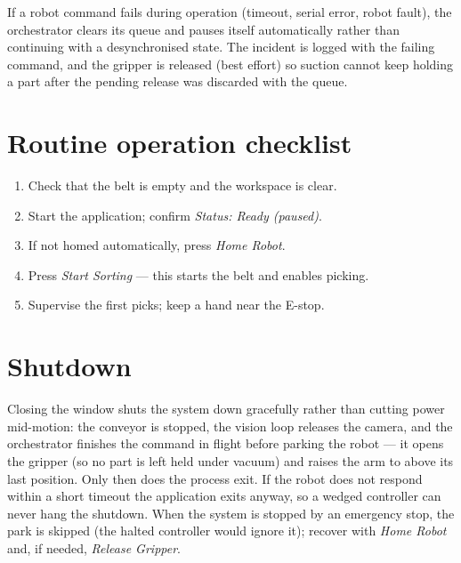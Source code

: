 \begin{notebox}
  If a robot command fails during operation (timeout, serial error, robot
  fault), the orchestrator clears its queue and pauses itself
  automatically rather than continuing with a desynchronised state. The
  incident is logged with the failing command, and the gripper is released
  (best effort) so suction cannot keep holding a part after the pending
  release was discarded with the queue.
\end{notebox}

\section{Routine operation checklist}
%
\begin{enumerate}
  \item Check that the belt is empty and the workspace is clear.
  \item Start the application; confirm \emph{Status: Ready (paused)}.
  \item If not homed automatically, press \emph{Home Robot}.
  \item Press \emph{Start Sorting} — this starts the belt and enables
    picking.
  \item Supervise the first picks; keep a hand near the E-stop.
\end{enumerate}

\section{Shutdown}
%
Closing the window shuts the system down gracefully rather than cutting
power mid-motion: the conveyor is stopped, the vision loop releases the
camera, and the orchestrator finishes the command in flight before parking
the robot --- it opens the gripper (so no part is left held under vacuum)
and raises the arm to  above its last position. Only then
does the process exit. If the robot does not respond within a short
timeout the application exits anyway, so a wedged controller can never
hang the shutdown. When the system is stopped by an emergency stop, the
park is skipped (the halted controller would ignore it); recover with
\emph{Home Robot} and, if needed, \emph{Release Gripper}.
